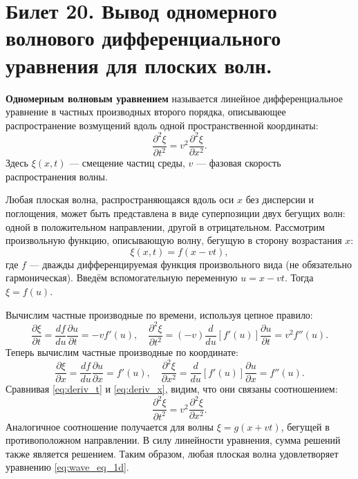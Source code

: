 \section{Билет 20. Вывод одномерного волнового дифференциального уравнения для плоских волн.}

\begin{definition}
\textbf{Одномерным волновым уравнением} называется линейное дифференциальное уравнение в частных производных второго порядка, описывающее распространение возмущений вдоль одной пространственной координаты:
\begin{equation}
    \frac{\partial^2 \xi}{\partial t^2} = v^2 \frac{\partial^2 \xi}{\partial x^2}. \label{eq:wave_eq_1d}
\end{equation}
Здесь $\xi(x, t)$ --- смещение частиц среды, $v$ --- фазовая скорость распространения волны.
\end{definition}

\begin{theorem}
Любая плоская волна, распространяющаяся вдоль оси $x$ без дисперсии и поглощения, может быть представлена в виде суперпозиции двух бегущих волн: одной в положительном направлении, другой в отрицательном. Рассмотрим произвольную функцию, описывающую волну, бегущую в сторону возрастания $x$:
\begin{equation}
    \xi(x, t) = f(x - vt), \label{eq:dalambert}
\end{equation}
где $f$ --- дважды дифференцируемая функция произвольного вида (не обязательно гармоническая). Введём вспомогательную переменную $u = x - vt$. Тогда $\xi = f(u)$.

Вычислим частные производные по времени, используя цепное правило:
\begin{equation}
    \frac{\partial \xi}{\partial t} = \frac{df}{du} \frac{\partial u}{\partial t} = -v f'(u), \quad
    \frac{\partial^2 \xi}{\partial t^2} = (-v) \frac{d}{du}[f'(u)] \frac{\partial u}{\partial t} = v^2 f''(u). \label{eq:deriv_t}
\end{equation}
Теперь вычислим частные производные по координате:
\begin{equation}
    \frac{\partial \xi}{\partial x} = \frac{df}{du} \frac{\partial u}{\partial x} = f'(u), \quad
    \frac{\partial^2 \xi}{\partial x^2} = \frac{d}{du}[f'(u)] \frac{\partial u}{\partial x} = f''(u). \label{eq:deriv_x}
\end{equation}
Сравнивая \eqref{eq:deriv_t} и \eqref{eq:deriv_x}, видим, что они связаны соотношением:
\begin{equation}
    \frac{\partial^2 \xi}{\partial t^2} = v^2 \frac{\partial^2 \xi}{\partial x^2}.
\end{equation}
Аналогичное соотношение получается для волны $\xi = g(x + vt)$, бегущей в противоположном направлении. В силу линейности уравнения, сумма решений также является решением. Таким образом, любая плоская волна удовлетворяет уравнению \eqref{eq:wave_eq_1d}.
\end{theorem}

